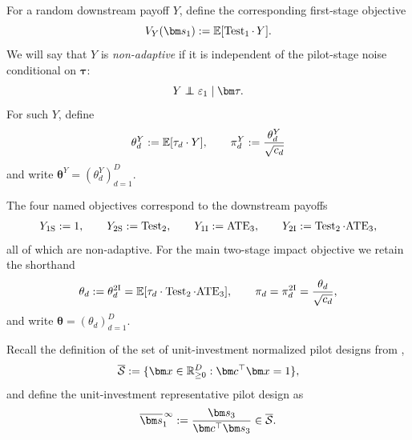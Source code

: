 For a random downstream payoff $Y$, define the corresponding first-stage objective
\[
  V_Y(\bm s_1)\defeq \E[\Test_1\cdot\, Y].
\]
We will say that $Y$ is \emph{non-adaptive} if it is independent of the pilot-stage noise conditional on $\bm\tau$:
\[
  Y \ind \varepsilon_1 \mid \bm\tau.
\]
For such $Y$, define
\[
  \theta_d^Y:= \mathbb{E}[\tau_d\cdot Y],
  \qquad
  \pi_d^Y:= \frac{\theta_d^Y}{\sqrt{c_d}}
\]
and write $\bm\theta^Y = (\theta_d^Y)_{d=1}^D$.

The four named objectives correspond to the downstream payoffs
\[
  Y_{\mathrm{1S}}:= 1,
  \qquad
  Y_{\mathrm{2S}}:= \operatorname{Test}_2,
  \qquad
  Y_{\mathrm{1I}}:= \mathrm{ATE}_3,
  \qquad
  Y_{\mathrm{2I}}:= \operatorname{Test}_2\cdot \mathrm{ATE}_3,
\]
all of which are non-adaptive.
For the main two-stage impact objective we retain the shorthand
\[
  \theta_d := \theta_d^{\mathrm{2I}}
  = \mathbb{E}[\tau_d\cdot\operatorname{Test}_2\cdot \mathrm{ATE}_3],
  \qquad
  \pi_d = \pi_d^{\mathrm{2I}} = \frac{\theta_d}{\sqrt{c_d}},
\]
and write $\bm\theta = (\theta_d)_{d=1}^D$.

Recall the definition of the set of unit-investment normalized pilot designs from ,
\[
  \overline{\mathcal{S}} \defeq \{\bm x\in\R_{\ge0}^D:\bm c^\top\bm x=1\},
\]
and define the unit-investment representative pilot design as
\[
  \overline{\bm s}_1^{\,\infty}
  \defeq
  \frac{\bm s_3}{\bm c^\top \bm s_3}\in\overline{\mathcal{S}}.
\]
